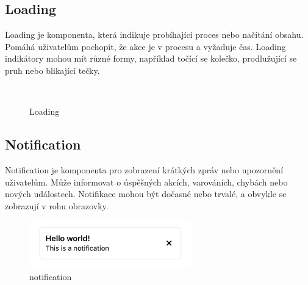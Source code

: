 \subsection{Loading}
Loading je komponenta, která indikuje probíhající proces nebo načítání obsahu. Pomáhá uživatelům pochopit, že akce je v procesu a vyžaduje čas. Loading indikátory mohou mít různé formy, například točící se kolečko, prodlužující se pruh nebo blikající tečky.

\begin{figure}[H]
  \centering
  \hspace{1cm}
  \\
  \captionsetup{justification=centering,margin=2cm}
  \caption{Loading}
\end{figure}

\subsection{Notification}
Notification je komponenta pro zobrazení krátkých zpráv nebo upozornění uživatelům. Může informovat o úspěšných akcích, varováních, chybách nebo nových událostech. Notifikace mohou být dočasné nebo trvalé, a obvykle se zobrazují v rohu obrazovky.

\begin{figure}[H]
  \centering
  \includegraphics[width=7cm]{images/notification}
  \captionsetup{justification=centering,margin=2cm}
  \caption{notification} \label{picture:notification}
\end{figure}

\clearpage

